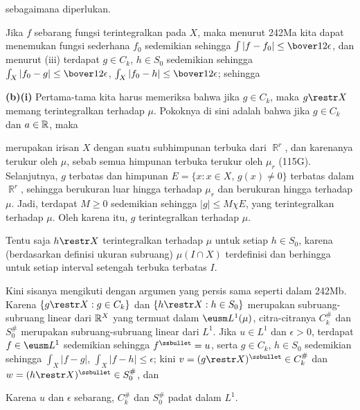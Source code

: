 {


\noindent sebagaimana diperlukan.

\medskip

 Jika $f$ sebarang fungsi terintegralkan pada $X$, maka
menurut 242Ma kita dapat menemukan fungsi sederhana $f_0$ sedemikian
sehingga $\int|f-f_0|\le\bover12\epsilon$, dan menurut (iii) terdapat
$g\in C_k$, $h\in S_0$ sedemikian sehingga
$\int_X|f_0-g|\le\bover12\epsilon$,
$\int_X|f_0-h|\le\bover12\epsilon$; sehingga




\medskip

{\bf (b)(i)} Pertama-tama kita harus memeriksa bahwa jika $g\in C_k$,
maka $g\restr X$ memang terintegralkan terhadap $\mu$. Pokoknya di sini adalah
bahwa jika $g\in C_k$ dan $a\in\Bbb R$, maka


\noindent merupakan irisan $X$ dengan suatu subhimpunan terbuka dari
$\BbbR^r$, dan karenanya terukur oleh $\mu$, sebab semua himpunan terbuka
terukur oleh $\mu_r$ (115G). Selanjutnya, $g$ terbatas dan himpunan
$E=\{x:x\in X,\,g(x)\ne 0\}$ terbatas dalam $\BbbR^r$, sehingga
berukuran luar hingga terhadap $\mu_r$ dan berukuran hingga terhadap
$\mu$. Jadi, terdapat $M\ge 0$ sedemikian sehingga
$|g|\le M\chi E$, yang terintegralkan terhadap $\mu$. Oleh karena itu, $g$
terintegralkan terhadap $\mu$.

Tentu saja $h\restr X$ terintegralkan terhadap $\mu$ untuk setiap $h\in S_0$,
karena (berdasarkan definisi ukuran subruang) $\mu(I\cap X)$ terdefinisi
dan berhingga untuk setiap interval setengah terbuka terbatas $I$.
\medskip

 Kini sisanya mengikuti dengan argumen yang persis sama
seperti dalam 242Mb. Karena $\{g\restr X:g\in C_k\}$ dan
$\{h\restr X:h\in S_0\}$ merupakan subruang-subruang linear dari
$\Bbb R^X$ yang termuat dalam $\eusm L^1(\mu)$, citra-citranya
$C_k^{\#}$ dan $S_0^{\#}$ merupakan subruang-subruang linear dari $L^1$.
Jika $u\in L^1$ dan $\epsilon>0$, terdapat $f\in\eusm L^1$ sedemikian
sehingga $f^{\ssbullet}=u$, serta $g\in C_k$, $h\in S_0$ sedemikian
sehingga $\int_X|f-g|$, $\int_X|f-h|\le\epsilon$; kini
$v=(g\restr X)^{\ssbullet}\in C_k^{\#}$ dan
$w=(h\restr X)^{\ssbullet}\in S_0^{\#}$, dan


\noindent Karena $u$ dan $\epsilon$ sebarang, $C_k^{\#}$ dan
$S_0^{\#}$ padat dalam $L^1$.
}%

